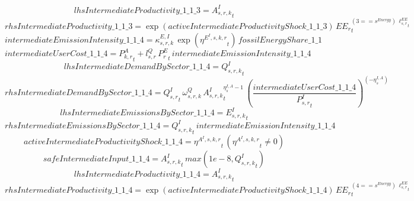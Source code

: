 \begin{dmath*}
lhsIntermediateProductivity\_1\_1\_3 = {{A^{I}_{s,r,k}}}_{t}
\end{dmath*}
\begin{dmath*}
rhsIntermediateProductivity\_1\_1\_3 = \exp\left({activeIntermediateProductivityShock\_1\_1\_3}\right)\, {{EE_r}}_{t}^{\left(3=={{s^{Energy}}}\right)\, {{\ell^{EE}_{s,r}}}_{t}}
\end{dmath*}
\begin{dmath*}
intermediateEmissionIntensity\_1\_1\_4 = {{\kappa^{E,I}_{s,r,k}}}\, \exp\left({{\eta^{E^{I},s,k,r}}}_{t}\right)\, {fossilEnergyShare\_1\_1}
\end{dmath*}
\begin{dmath*}
intermediateUserCost\_1\_1\_4 = {{P^{A}_{k,r}}}_{t}+{{l^{Q}_{s,r}}}\, {{P^E_r}}_{t}\, {intermediateEmissionIntensity\_1\_1\_4}
\end{dmath*}
\begin{dmath*}
lhsIntermediateDemandBySector\_1\_1\_4 = {{Q^{I}_{s,r,k}}}_{t}
\end{dmath*}
\begin{dmath*}
rhsIntermediateDemandBySector\_1\_1\_4 = {{Q^{I}_{s,r}}}_{t}\, {{\omega^{Q}_{s,r,k}}}\, {{A^{I}_{s,r,k}}}_{t}^{{{\eta^{I,A}_{s}}}-1}\, \left(\frac{{intermediateUserCost\_1\_1\_4}}{{{P^{I}_{s,r}}}_{t}}\right)^{\left(-{{\eta^{I,A}_{s}}}\right)}
\end{dmath*}
\begin{dmath*}
lhsIntermediateEmissionsBySector\_1\_1\_4 = {{E^I_{s,r,k}}}_{t}
\end{dmath*}
\begin{dmath*}
rhsIntermediateEmissionsBySector\_1\_1\_4 = {{Q^{I}_{s,r,k}}}_{t}\, {intermediateEmissionIntensity\_1\_1\_4}
\end{dmath*}
\begin{dmath*}
activeIntermediateProductivityShock\_1\_1\_4 = {{\eta^{A^{I},s,k,r}}}_{t}\, \left({{\eta^{A^{I},s,k,r}}}_{t}\neq 0\right)
\end{dmath*}
\begin{dmath*}
safeIntermediateInput\_1\_1\_4 = {{A^{I}_{s,r,k}}}_{t}\, max(1e-8,{{Q^{I}_{s,r,k}}}_{t})
\end{dmath*}
\begin{dmath*}
lhsIntermediateProductivity\_1\_1\_4 = {{A^{I}_{s,r,k}}}_{t}
\end{dmath*}
\begin{dmath*}
rhsIntermediateProductivity\_1\_1\_4 = \exp\left({activeIntermediateProductivityShock\_1\_1\_4}\right)\, {{EE_r}}_{t}^{\left(4=={{s^{Energy}}}\right)\, {{\ell^{EE}_{s,r}}}_{t}}
\end{dmath*}
